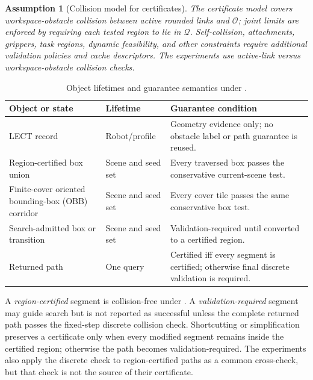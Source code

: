 \documentclass[journal]{IEEEtran}
\newtheorem{assumption}{Assumption}
\newcommand{\calO}{\ensuremath{\mathcal{O}}}
\newcommand{\Q}{\ensuremath{\mathcal{Q}}}
\begin{document}
\begin{assumption}[Collision model for certificates]
\label{ass:collision_model}
The certificate model covers workspace-obstacle collision between active rounded
links and $\calO$; joint limits are enforced by requiring each tested region to
lie in $\Q$. Self-collision, attachments, grippers, task regions, dynamic
feasibility, and other constraints require additional validation policies and
cache descriptors. The experiments use active-link versus workspace-obstacle
collision checks.
\end{assumption}

\begin{table}[!t]
\centering
\caption{Object lifetimes and guarantee semantics under
.}
\label{tab:guarantee_semantics}
\footnotesize
\setlength{\tabcolsep}{2.5pt}
\renewcommand{\arraystretch}{1.06}
\begin{tabular}{@{}M{0.25\columnwidth}M{0.20\columnwidth}M{0.48\columnwidth}@{}}
\toprule
Object or state & Lifetime & Guarantee condition \\
\midrule
LECT record & Robot/profile & Geometry evidence only; no obstacle label or path guarantee is reused. \\
Region-certified box union & Scene and seed set & Every traversed box passes the conservative current-scene test. \\
Finite-cover oriented bounding-box (OBB) corridor & Scene and seed set & Every cover tile passes the same conservative box test. \\
Search-admitted box or transition & Scene and seed set & Validation-required until converted to a certified region. \\
Returned path & One query & Certified iff every segment is certified; otherwise final discrete validation is required. \\
\bottomrule
\end{tabular}
\end{table}

A \emph{region-certified} segment is collision-free under
. A \emph{validation-required} segment may guide
search but is not reported as successful unless the complete returned path
passes the fixed-step discrete collision check. Shortcutting or simplification
preserves a certificate only when every modified segment remains inside the
certified region; otherwise the path becomes validation-required. The
experiments also apply the discrete check to region-certified paths as a common
cross-check, but that check is not the source of their certificate.
\end{document}
